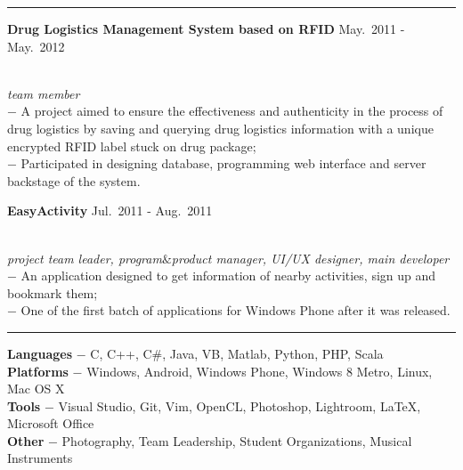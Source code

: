 \documentclass[a4paper,10pt]{article}
\newcommand{\shadedsection}[1]{
    \setlength{\fboxsep}{0pt}
    \colorbox{shadecolor}{%
        \begin{minipage}{\linewidth}%
            \vspace{0.2em}%
            #1%
        \end{minipage}%
    }
}
\newenvironment{rSection}[1]{ %
  \medskip
  \hspace{-1.5em}{\color{Blue}\MakeUppercase{\large \bf {#1}}} %
  \vspace{-0.2em}
  \medskip
  \hrule %
  \begin{list}{}{ %
    \setlength{\leftmargin}{1.5em} %
  }
\setlength{\itemsep}{1pt}
  \item[]
}{
  \end{list}
}
\newcommand{\detail}[1]{{$-$ {#1}}}
\newcommand{\period}[3]{\normalsize {#1} \hfill {#2} - {#3}}
\newcommand{\skill}[2]{{\bf #1} \detail{{#2}}}
\begin{document}
\begin{rSection}{Main Projects}
  \item
    \shadedsection{\period{\bf Drug Logistics Management System based on RFID}{May.~2011}{May.~2012}}\\
    {\em team member}\\
    \detail{A project aimed to ensure the effectiveness and authenticity in the process of drug logistics by saving and querying drug logistics information with a unique encrypted RFID label stuck on drug package;}\\%
    \detail{Participated in designing database, programming web interface and server backstage of the system.}

  \item
    \shadedsection{\period{\bf EasyActivity}{Jul.~2011}{Aug.~2011}}\\
    {\em project team leader, program$\&$product manager, UI/UX designer, main developer}\\
    \detail{An application designed to get information of nearby activities, sign up and bookmark them;}\\
    \detail{One of the first batch of applications for Windows Phone after it was released.}
\end{rSection}

\vspace{-0.5em}

\begin{rSection}{Skills}
  \vspace{-1.5em}
  \item
\skill{Languages}{C, C++, C\#, Java, VB, Matlab, Python, PHP, Scala}\\
\skill{Platforms}{Windows, Android, Windows Phone, Windows 8 Metro, Linux, Mac OS X}\\
\skill{Tools}{Visual Studio, Git, Vim, OpenCL, Photoshop, Lightroom, \LaTeX, Microsoft Office}\\
\skill{Other}{Photography, Team Leadership, Student Organizations, Musical Instruments}
\end{rSection}

\vspace{-0.5em}
\end{document}
